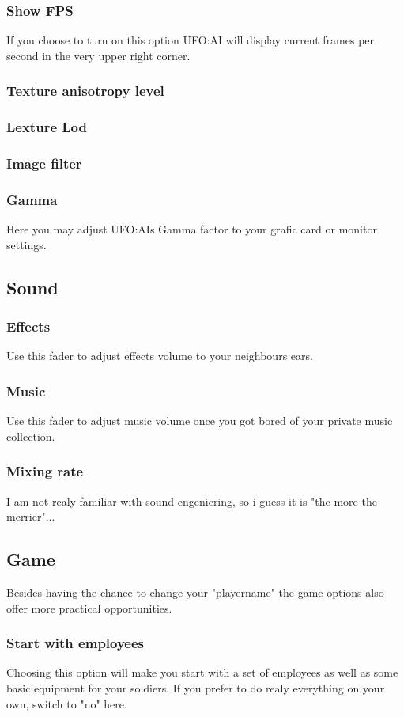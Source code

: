 \subsubsection*{Show FPS}
If you choose to turn on this option UFO:AI will display current frames per second in the very upper right corner.
\subsubsection*{Texture anisotropy level}
\subsubsection*{Lexture Lod}
\subsubsection*{Image filter}
\subsubsection*{Gamma}
Here you may adjust UFO:AIs Gamma factor to your grafic card or monitor settings.

\subsection{Sound}
\subsubsection*{Effects}
Use this fader to adjust effects volume to your neighbours ears.
\subsubsection*{Music}
Use this fader to adjust music volume once you got bored of your private music collection.
\subsubsection*{Mixing rate}
I am not realy familiar with sound engeniering, so i guess it is "the more the merrier"...

\subsection{Game}
Besides having the chance to change your "playername" the game options also offer more practical opportunities.
\subsubsection*{Start with employees}
Choosing this option will make you start with a set of employees as well as some basic equipment for your soldiers. If you prefer to do realy everything on your own, switch to "no" here.
